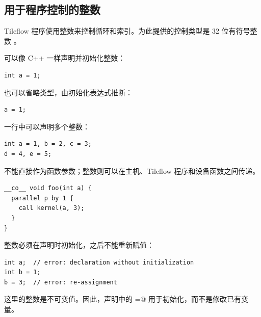 \subsection*{用于程序控制的整数}

Tileflow 程序使用整数来控制循环和索引。为此提供的控制类型是 32 位有符号整数 \co@int@。

可以像 C++ 一样声明并初始化整数：

\begin{lstlisting}[language=croqtile,caption={已初始化的整数}]
int a = 1;
\end{lstlisting}

也可以省略类型，由初始化表达式推断：

\begin{lstlisting}[language=croqtile,caption={对整数赋值}]
a = 1;
\end{lstlisting}

一行中可以声明多个整数：

\begin{lstlisting}[language=croqtile,caption={一次定义多个整数}]
int a = 1, b = 2, c = 3;
d = 4, e = 5;
\end{lstlisting}

\co@mdspan@ 不能直接作为函数参数；整数则可以在主机、Tileflow 程序和设备函数之间传递。

\begin{lstlisting}[language=croqtile,caption={整数参数}]
__co__ void foo(int a) {
  parallel p by 1 {
    call kernel(a, 3);
  }
}
\end{lstlisting}

整数必须在声明时初始化，之后不能重新赋值：

\begin{lstlisting}[language=croqtile,caption={未初始化的声明}]
int a;  // error: declaration without initialization
int b = 1;
b = 3;  // error: re-assignment
\end{lstlisting}

这里的整数是不可变值。因此，声明中的 \co@=@ 用于初始化，而不是修改已有变量。
